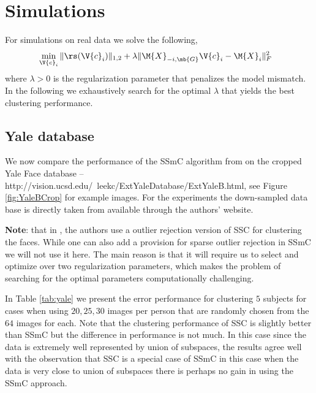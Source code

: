 \documentclass[conference]{IEEEtran}
\begin{document}

\section{Simulations}
For simulations on real data we solve the following,
\begin{align}
&\min_{\V{c}_i} \| \rs(\V{c}_i)\|_{1,2} + \lambda \| \M{X}_{-i,\mb{G}}\V{c}_i - \M{X}_i\|_{F}^{2}  
\end{align}
where $\lambda > 0 $ is the regularization parameter that penalizes the model mismatch. In the following we exhaustively search for the optimal $\lambda$ that yields the best clustering performance.


\label{sec:sims} 
\subsection{Yale database}
We now compare the performance of the SSmC algorithm from \cite{Kernfeld:2014wta} on the cropped Yale Face database -- http://vision.ucsd.edu/~leekc/ExtYaleDatabase/ExtYaleB.html, see Figure \ref{fig:YaleBCrop} for example images. For the experiments the down-sampled data base is directly taken from \cite{Elhamifar:2012uz} available through the authors' website. 

\textbf{Note}: that in \cite{Elhamifar:2012uz}, the authors use a outlier rejection version of SSC for clustering the faces. While one can also add a provision for sparse outlier rejection in SSmC we will not use it here. The main reason is that it will require us to select and optimize over two regularization parameters, which makes the problem of searching for the optimal parameters computationally challenging.

In Table \ref{tab:yale} we present the error performance for clustering $5$ subjects for cases when using $20,25,30$ images per person that are randomly chosen from the $64$ images for each. Note that the clustering performance of SSC is slightly better than SSmC but the difference in performance is not much. In this case since the data is extremely well represented by union of subspaces, the results agree well with the observation that SSC is a special case of SSmC in this case when the data is very close to union of subspaces there is perhaps no gain in using the SSmC approach. 
\end{document}
